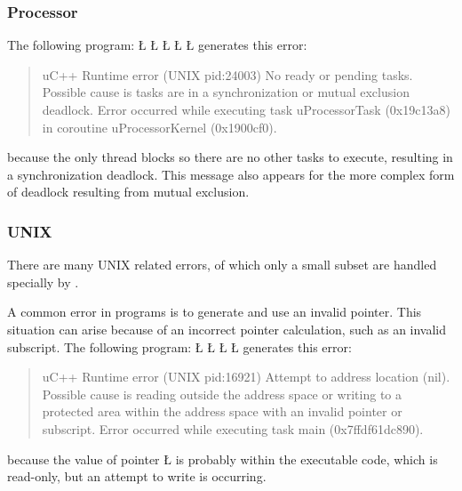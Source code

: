 \documentclass[openright,twoside]{report}
\begin{document}
\subsubsection{Processor}

The following program:
\LGinlinefalse\LGbegin\lgrinde
\L{}
\L{}
\L{\LB{}}
\L{\LB{}}
\CE{}\L{\LB{\}}}
\endlgrinde\LGend
generates this error:
\begin{quote}
\BGfont
uC++ Runtime error (UNIX pid:24003) No ready or pending tasks.
Possible cause is tasks are in a synchronization or mutual exclusion deadlock.
Error occurred while executing task uProcessorTask (0x19c13a8) in coroutine uProcessorKernel (0x1900cf0).
\end{quote}
because the only thread blocks so there are no other tasks to execute, resulting in a synchronization deadlock.
This message also appears for the more complex form of deadlock resulting from mutual exclusion.


\subsubsection{UNIX}

There are many UNIX related errors, of which only a small subset are handled specially by \uC.

A common error in \CC programs is to generate and use an invalid pointer.
This situation can arise because of an incorrect pointer calculation, such as an invalid subscript.
The following program:
\LGinlinefalse\LGbegin\lgrinde
\L{}
\L{\LB{}}
\CE{}\L{\LB{}}
\CE{}\L{\LB{\}}}
\endlgrinde\LGend
generates this error:
\begin{quote}
\BGfont
uC++ Runtime error (UNIX pid:16921) Attempt to address location (nil).
Possible cause is reading outside the address space or writing to a protected area within the address space with an invalid pointer or subscript.
Error occurred while executing task main (0x7ffdf61dc890).
\end{quote}
because the value of pointer \LGinlinetrue\LGbegin\lgrinde\L{}\endlgrinde\LGend{} is probably within the executable code, which is read-only, but an attempt to write is occurring.
\end{document}
